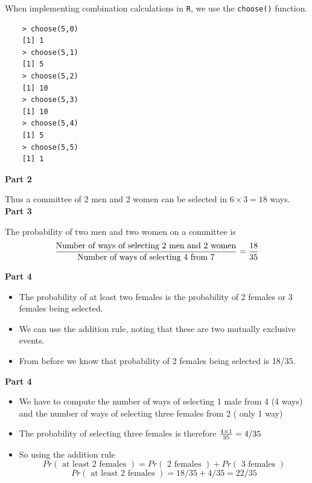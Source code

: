 \documentclass[12pt]{report}
\begin{document}
When implementing combination calculations in \texttt{R}, we use the \texttt{choose()} function.
\begin{framed}	
	\begin{verbatim}
	> choose(5,0)
	[1] 1
	> choose(5,1)
	[1] 5
	> choose(5,2)
	[1] 10
	> choose(5,3)
	[1] 10
	> choose(5,4)
	[1] 5
	> choose(5,5)
	[1] 1
	\end{verbatim}
\end{framed}
	
	{\Large
		
		\textbf{Part 2}
		
		Thus a committee of 2 men and 2 women can be selected in $ 6 \times 3  = 18 $ ways.\\
		\bigskip
		\textbf{Part 3}
		
		The probability of two men and two women on a committee is
		\[ {\mbox{Number of ways of selecting 2 men and 2 women} \over \mbox{Number of ways of selecting 4 from 7}} = {18 \over 35 }\]
		
	}
	{\Large
		
		\textbf{Part 4}
		\begin{itemize}
			\item The probability of at least two females is the probability of 2 females or 3 females being selected.
			\item We can use the addition rule, noting that these are two mutually exclusive events.
			\item From before we know that probability of 2 females being selected is 18/35.
		\end{itemize}
		
	}
	{\Large
		
		\textbf{Part 4}
		\begin{itemize}
			\item We have to compute the number of ways of selecting 1 male from 4 (4 ways) and the number of ways of selecting three females from 2 ( only 1 way)
			\item The probability of selecting three females is therefore ${4 \times 1 \over 35} = 4/35$
			\item So using the addition rule
			\[ Pr(\mbox{ at least 2 females }) = Pr(\mbox{ 2 females }) + Pr(\mbox{ 3 females }) \]
			\[ Pr(\mbox{ at least 2 females })  = 18/35 + 4/35 = 22/35 \]
		\end{itemize}
		
	}
	
\end{document}
